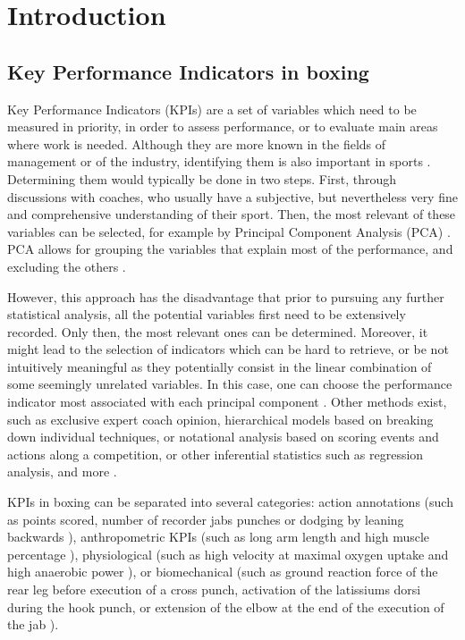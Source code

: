 \newpage






\section{Introduction}

\subsection{Key Performance Indicators in boxing}

Key Performance Indicators (KPIs) are a set of variables which need to be measured in priority, in order to assess performance, or to evaluate main areas where work is needed. Although they are more known in the fields of management or of the industry, identifying them is also important in sports \cite{Hughes2002,Butterworth2013}. Determining them would typically be done in two steps. First, through discussions with coaches, who usually have a subjective, but nevertheless very fine and comprehensive understanding of their sport. Then, the most relevant of these variables can be selected, for example by Principal Component Analysis (PCA) \cite{Hotelling1933}. PCA allows for grouping the variables that explain most of the performance, and excluding the others \cite{ODonoghue2008}.

However, this approach has the disadvantage that prior to pursuing any further statistical analysis, all the potential variables first need to be extensively recorded. Only then, the most relevant ones can be determined. Moreover, it might lead to the selection of indicators which can be hard to retrieve, or be not intuitively meaningful as they potentially consist in the linear combination of some seemingly unrelated variables. In this case, one can choose the performance indicator most associated with each principal component \cite{ODonoghue2008}. Other methods exist, such as exclusive expert coach opinion, hierarchical models based on breaking down individual techniques, or notational analysis based on scoring events and actions along a competition, or other inferential statistics such as regression analysis, and more \cite{Hughes2002,Butterworth2013}.

KPIs in boxing can be separated into several categories: action annotations (such as points scored, number of recorder jabs punches or dodging by leaning backwards \cite{Thomson2013}), anthropometric KPIs (such as long arm length and high muscle percentage \cite{Chaabene2015}), physiological (such as high velocity at maximal oxygen uptake and high anaerobic power \cite{Chaabene2015}), or biomechanical (such as ground reaction force of the rear leg before execution of a cross punch, activation of the latissiums dorsi during the hook punch, or extension of the elbow at the end of the execution of the jab \cite{Lenetsky2020}). 

